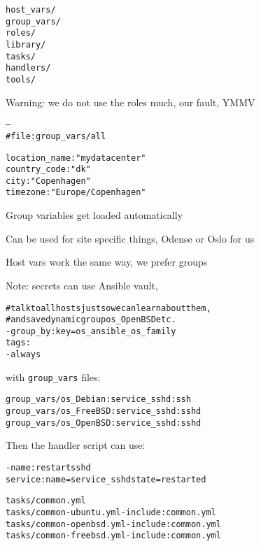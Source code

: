 \documentclass[18pt,landscape,a4paper,footrule]{foils}
\begin{document}
\begin{alltt}
host_vars/
group_vars/
roles/
library/
tasks/
handlers/
tools/
\end{alltt}

Warning: we do not use the roles much, our fault, YMMV




\begin{alltt}
---
# file: group_vars/all

location_name : "mydatacenter"
country_code : "dk"
city : "Copenhagen"
timezone : "Europe/Copenhagen"
\end{alltt}

\begin{list2}
\item Group variables get loaded automatically
\item Can be used for site specific things, Odense or Oslo for us
\item Host vars work the same way, we prefer groups
\item Note: secrets can use Ansible vault, 
\end{list2}



\begin{alltt}
  # talk to all hosts just so we can learn about them,
  # and save dynamic group os_OpenBSD etc.
  - group_by: key=os_{{ ansible_os_family }}
    tags:
        - always
\end{alltt}

with \verb+group_vars+ files:
\begin{alltt}
group_vars/os_Debian:service_sshd: ssh
group_vars/os_FreeBSD:service_sshd: sshd
group_vars/os_OpenBSD:service_sshd: sshd
\end{alltt}

Then the handler script can use:
\begin{alltt}
  - name: restart sshd
    service: name={{ service_sshd }} state=restarted
\end{alltt}




\begin{alltt}
tasks/common.yml
tasks/common-ubuntu.yml - include: common.yml
tasks/common-openbsd.yml - include: common.yml
tasks/common-freebsd.yml - include: common.yml
\end{alltt}
\end{document}
